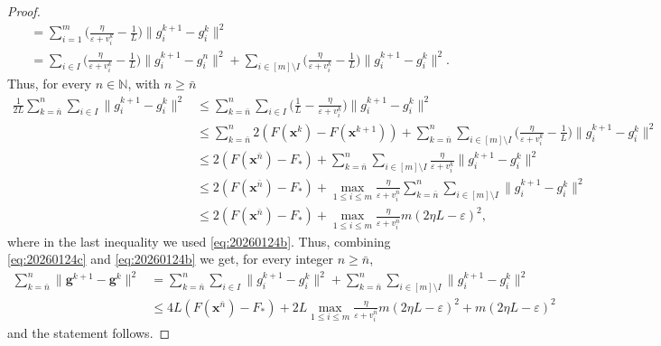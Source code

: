 \documentclass[11pt]{article}
\theoremstyle{plain}
\theoremstyle{definition}
\theoremstyle{remark}
\newcommand{\norm}[1]{\lVert{#1}\rVert}
\newcommand{\bx}{\bm{x}}
\newcommand{\buu}{\bm{g}}
\newcommand{\uu}{g}
\newcommand{\iter}{n}
\newcommand{\ite}{k}
\newcommand{\N}{\mathbb{N}}
\begin{document}
\begin{proof}
\begin{align*}
    &=\sum_{i=1}^m \bigg(\frac{\eta}{\varepsilon + v^\ite_i} - \frac1 L \bigg)\norm{\uu^{\ite+1}_i - \uu^{\ite}_i}^2 \\
        &=\sum_{i\in I} \bigg(\frac{\eta}{\varepsilon + v^\ite_i} - \frac1 L \bigg)\norm{\uu^{\ite+1}_i - \uu^{\iter}_i}^2 + \sum_{i\in [m]\setminus I} \bigg(\frac{\eta}{\varepsilon + v^\ite_i} - \frac1 L \bigg)\norm{\uu^{\ite+1}_i - \uu^{\ite}_i}^2.
\end{align*}
Thus, for every $\iter\in \N$, with $\iter\geq \bar{\iter}$
\begin{align}
\label{eq:20260124c}
\nonumber\frac{1}{2L}\sum_{\ite= \bar{\iter}}^{\iter}\sum_{i\in I} \norm{\uu^{\ite+1}_i - \uu^{\ite}_i}^2 &\leq
\sum_{\ite= \bar{\iter}}^{\iter}\sum_{i\in I} \bigg(\frac1 L - \frac{\eta}{\varepsilon + v^\ite_i} \bigg)\norm{\uu^{\ite+1}_i - \uu^{\ite}_i}^2\\
\nonumber &\leq \sum_{\ite = \bar{\iter}}^{\iter} 2(F(\bx^{\ite}) - F(\bx^{\ite+1}))  
+ \sum_{\ite=\bar{\iter}}^{\iter}\sum_{i\in [m]\setminus I} \bigg(\frac{\eta}{\varepsilon + v^\ite_i} - \frac1 L \bigg)\norm{\uu^{\ite+1}_i - \uu^{\ite}_i}^2\\
\nonumber&\leq 2(F(\bx^{\bar{\iter}}) - F_*)  
+ \sum_{\ite=\bar{\iter}}^{\iter}\sum_{i\in [m]\setminus I} \frac{\eta}{\varepsilon + v^\ite_i} \norm{\uu^{\ite+1}_i - \uu^{\ite}_i}^2\\
\nonumber&\leq 2(F(\bx^{\bar{\iter}}) - F_*)  
+ \max_{1\leq i\leq m} \frac{\eta}{\varepsilon + v^{\bar{\iter}}_i} \sum_{\ite=\bar{\iter}}^{\iter} \sum_{i\in [m]\setminus I} \norm{\uu^{\ite+1}_i - \uu^{\ite}_i}^2\\
&\leq 2(F(\bx^{\bar{\iter}}) - F_*)  
+ \max_{1\leq i\leq m} \frac{\eta}{\varepsilon + v^{\bar{\iter}}_i} m(2\eta L- \varepsilon)^2,
\end{align}
where in the last inequality we used \eqref{eq:20260124b}. Thus, combining \eqref{eq:20260124c}
and \eqref{eq:20260124b} we get, for every integer $\iter\geq \bar{\iter}$,
\begin{align*}
\sum_{\ite=\bar{\iter}}^{\iter} \norm{\buu^{\ite+1}-\buu^{\ite}}^2 &= 
\sum_{\ite=\bar{\iter}}^{\iter} \sum_{i\in I} \norm{\uu_i^{\ite+1}-\uu_i^{\ite}}^2 
+\sum_{\ite=\bar{\iter}}^{\iter} \sum_{i\in [m]\setminus I} \norm{\uu_i^{\ite+1}-\uu_i^{\ite}}^2\\
&\leq 4L (F(\bx^{\bar{\iter}}) - F_*)  
+ 2L \max_{1\leq i\leq m} \frac{\eta}{\varepsilon + v^{\bar{\iter}}_i} m(2\eta L- \varepsilon)^2
+ m(2\eta L- \varepsilon)^2
\end{align*}
and the statement follows.
\end{proof}
\end{document}
